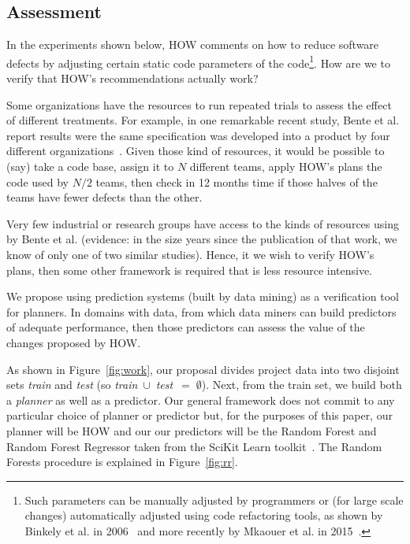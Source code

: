 \documentclass[conference]{IEEEtran}
\newcommand{\fig}[1]{Figure~\ref{fig:#1}}
\begin{document}
\subsection{Assessment}\label{sect:assess}
In the experiments shown below,  HOW comments  on how to reduce
software defects by adjusting certain static code parameters of the code\footnote{Such parameters can be manually adjusted by programmers or (for large scale changes) automatically adjusted using code refactoring
tools, as shown by Binkely et al. in 2006~\cite{Binkley2006} and more recently by Mkaouer et al. in 2015~\cite{Mkaouer15}.}. How are we to verify that HOW's recommendations actually work? 

Some organizations have the resources to 
run repeated trials to assess the effect of different treatments.
For example, in one remarkable recent study, Bente et al. report results
were the same specification was developed into a product by four different organizations~\cite{Anda2009}. Given those kind of resources, it would be possible
to (say) take a code base, assign it to $N$ different teams, apply
HOW's plans the code used by  $N/2$ teams, then check in 12 months time
if those halves of the teams have fewer defects than the other.  

Very few industrial or research groups have access
to the kinds of resources using by Bente et al. (evidence: in the size years since the
publication of that work, we know of only one of two similar studies). Hence, it
we wish to verify HOW's plans, then some other framework is required that is less
resource intensive.
 




We propose using prediction systems (built by data mining) as a verification
tool for planners. In domains with data, from which data miners can build
predictors of adequate performance, then those predictors can assess the value
of the changes proposed by HOW.

As shown in \fig{work}, our proposal divides
project data  into two disjoint sets {\em train} and {\em test}
(so \mbox{{\em train} $\cup$ {\em test} $=\;\emptyset$}).
Next, from the train set, we build both a {\em planner} as well
as a {  predictor}. Our general framework does not   commit to any particular  choice
of { planner} or { predictor} but, for the purposes of this paper, 
our { planner}
will be HOW  and our
our { predictors} will be the Random Forest and Random Forest
Regressor taken from the SciKit
Learn toolkit~\cite{Pedregosa2012}. The Random Forests procedure is explained in \fig{rr}. 
\end{document}
